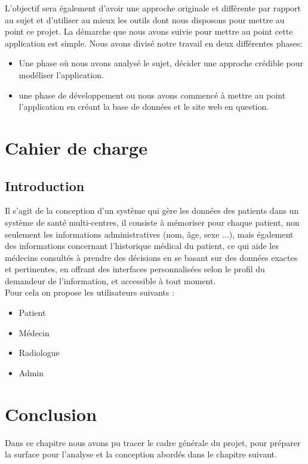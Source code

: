 L’objectif sera également d’avoir une approche originale et différente par rapport au
 sujet et d’utiliser au mieux les outils dont nous disposons pour mettre au point ce projet.
La démarche que nous avons suivie pour mettre au point cette application est simple.
 Nous avons divisé notre travail en deux différentes phases:
 \begin{itemize}
 \item Une phase où nous avons analysé le sujet, décider une approche crédible pour modéliser
l’application.
 \item une phase de développement ou nous avons commencé à mettre au point l’application en créant la base de données et le site web en question.
 \end{itemize}
 

\section{Cahier de charge}

\subsection{Introduction}

Il s’agit de la conception d’un système qui gère les données des patients dans un système de santé multi-centres, il consiste à mémoriser pour chaque patient, non seulement les informations administratives (nom, âge, sexe ...), mais également des informations concernant l’historique médical du patient, ce qui aide les médecins consultés à prendre des décisions en se basant sur des données exactes et pertinentes, en offrant des interfaces personnalisées selon le profil du demandeur de l’information, et accessible à tout moment.\\
Pour cela on propose les utilisateurs suivants : 

\begin{itemize}
\item Patient
\item Médecin
\item Radiologue
\item Admin
\end{itemize}
 





\section{Conclusion}
Dans ce chapitre nous avons pu tracer le cadre générale du projet, pour préparer la surface pour l'analyse et la conception abordés dans le chapitre suivant.



